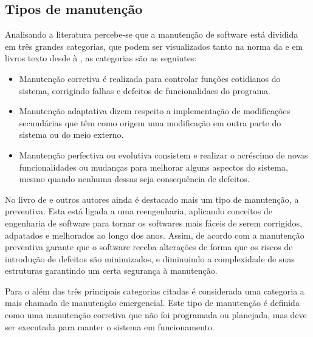 \subsection{Tipos de manutenção}
\label{sub-tipo-manut}

Analisando a literatura percebe-se que a manutenção de software está dividida em três grandes categorias, que podem ser visualizados tanto na norma da \cite{ieee1219} e em livros texto desde \cite{lientz1980software} à \cite{pfleeger2004engenharia}, as categorias são as seguintes:
\begin{itemize}
\item Manutenção corretiva é realizada para controlar funções cotidianos do sistema, corrigindo falhas e defeitos de funcionalidaes do programa.

\item Manutenção adaptativa dizem respeito a implementação de modificações secundárias que têm como origem uma modificação em outra parte do sistema ou do meio externo.

\item Manutenção perfectiva ou evolutiva consistem e realizar o acréscimo de novas funcionalidades ou mudanças para melhorar alguns aspectos do sistema, mesmo quando nenhuma dessas seja consequência de defeitos.
\end{itemize}

No livro de  e outros autores ainda é destacado mais um tipo de manutenção, a preventiva. Esta está ligada a uma reengenharia, aplicando conceitos de engenharia de software para tornar os softwares mais fáceis de serem corrigidos, adpatados e melhorados ao longo dos anos. Assim, de acordo com \cite{criscuolo2008qualidade} a manutenção preventiva garante que o software receba alterações de forma que os riscos de introdução de defeitos são minimizados, e diminuindo a complexidade de suas estruturas garantindo um certa segurança à manutenção.


Para o \cite{ieee1219} além das três principais categorias citadas é considerada uma categoria a mais chamada de manutenção emergencial. Este tipo de manutenção é definida como uma manutenção corretiva que não foi programada ou planejada, mas deve ser executada para manter o sistema em funcionamento.
